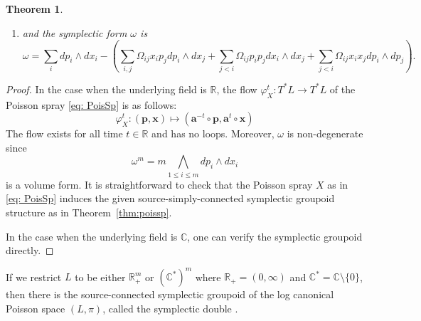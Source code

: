 \documentclass{amsart}
\newtheorem{theorem}{Theorem}[section]
\newcommand{\bfa}{\mathbf{a}}
\newcommand{\bfp}{\mathbf{p}}
\newcommand{\bfx}{\mathbf{x}}
\newcommand{\CC}{\mathbb{C}}
\newcommand{\RR}{\mathbb{R}}
\begin{document}
\begin{theorem}
\begin{enumerate}
$$\begin{aligned}
				\end{aligned}
			$$
		\item and the symplectic form $\omega$ is
		$$
			\omega = \sum_{i} dp_i \wedge dx_i
			- \left(
			\sum_{i, j} \Omega_{ij}x_i p_j d p_i \wedge d x_j 
			+ \sum_{j < i} \Omega_{ij}p_ip_j d x_i \wedge d x_j
			+ \sum_{j < i} \Omega_{ij}x_ix_j d p_i \wedge d p_j
			\right).
		$$
	\end{enumerate}
\end{theorem}

\begin{proof}
	In the case when the underlying field is $\RR$, the flow $\varphi_X^t: T^*L \to T^*L$ of the Poisson spray \eqref{eq: PoisSp} is as follows:
	$$
		\varphi_X^t: (\bfp, \bfx) \mapsto (\bfa^{-t} \circ \bfp, \bfa^t \circ \bfx)
	$$
The flow exists for all time $t \in \RR$ and has no loops. Moreover, $\omega$ is non-degenerate since
	$$
		\omega^m = m \bigwedge\limits_{1\leq i\leq m} dp_i \wedge dx_i
	$$
	is a volume form.
	It is straightforward to check that the Poisson spray $X$ as in \eqref{eq: PoisSp} induces the given source-simply-connected symplectic groupoid structure as in Theorem~\ref{thm:poissp}.
	
	In the case when the underlying field is $\CC$, one can verify the symplectic groupoid directly.
\end{proof}

If we restrict $L$ to be either $\RR_+^m$ or $(\CC^*)^m$ where $\RR_+ = (0, \infty)$ and $\CC^* = \CC \setminus \{0\}$, then there is the source-connected symplectic groupoid of the log canonical Poisson space $(L, \pi)$, called the symplectic double \cite{MR2470108}.
\end{document}
